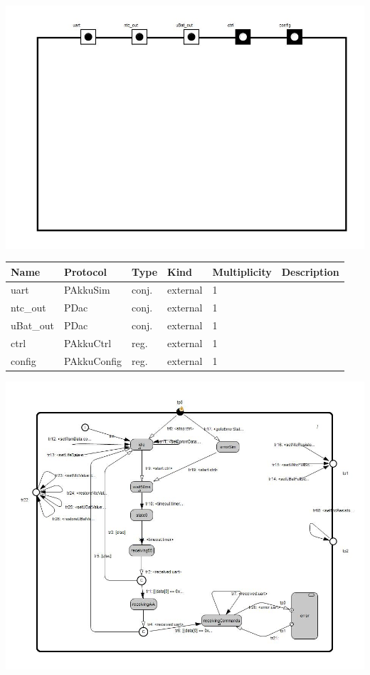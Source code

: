 
{
\centering{}
\includegraphics[width=1.0\textwidth]{./images/AAkkuSimu_structure.jpg}
}

\begin{tabular}[ht]{|l|l|l|l|l|p{5cm}|}
\hline
\textbf{Name} & \textbf{Protocol} & \textbf{Type} & \textbf{Kind} & \textbf{Multiplicity} & \textbf{Description}\\
\hline
uart & PAkkuSim & conj. & external & 1 & \\
\hline
ntc\_out & PDac & conj. & external & 1 & \\
\hline
uBat\_out & PDac & conj. & external & 1 & \\
\hline
ctrl & PAkkuCtrl & reg. & external & 1 & \\
\hline
config & PAkkuConfig & reg. & external & 1 & \\
\hline
\end{tabular}

{
\centering{}
\includegraphics[width=1.0\textwidth]{./images/AAkkuSimu_behavior.jpg}
}

